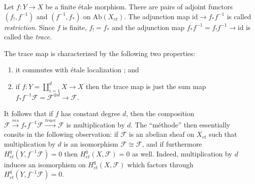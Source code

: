 \begin{definition}
\label{definition-trace-map}
Let $f : Y \to X$ be a finite \'etale morphism. There are pairs of adjoint
functors $(f_!,f^{-1})$ and $(f^{-1},f_*)$ on $\text{Ab}(X_{et})$. The
adjunction map $\text{id} \to f_* f^{-1}$ is called {\it restriction}. Since
$f$ is finite, $f_! = f_*$ and the adjunction map $f_* f^{-1} = f_! f^{-1} \to
\text{id}$ is called the {\it trace}.
\end{definition}

\noindent
The trace map is characterized by the following two properties:
\begin{enumerate}
\item
it commutes with \'etale localization ; and
\item
if $f: Y = \coprod_{i=1}^d X \to X$ then the trace map is just the sum map $f_*
f^{-1} \mathcal{F} = \mathcal{F}^{\oplus d} \to \mathcal{F}$.
\end{enumerate}
It follows that if $f$ has constant degree $d$, then the composition
$\mathcal{F} \xrightarrow{res} f_* f^{-1} \mathcal{F} \xrightarrow{trace}
\mathcal{F}$ is multiplication by $d$. The ``m\'ethode'' then essentially
consits in the following observation: if $\mathcal{F}$ is an abelian sheaf on
$X_{et}$ such that multiplication by $d$ is an isomorphism $\mathcal{F} \cong
\mathcal{F}$, and if furthermore $H_{et}^q(Y,f^{-1}\mathcal{F}) = 0$ then
$H_{et}^q(X,\mathcal{F}) = 0$ as well. Indeed, multiplication by $d$ induces an
isomorphism on $H_{et}^q(X, \mathcal{F})$ which factors through
$H_{et}^q(Y,f^{-1}\mathcal{F})= 0$.

